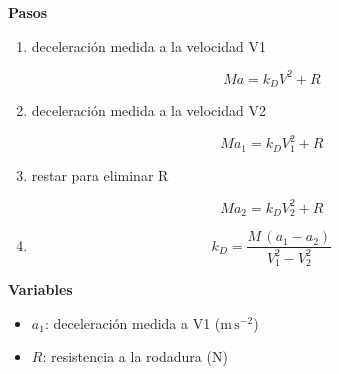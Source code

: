 \documentclass[10pt,openany]{book}
\begin{document}
\begin{tcolorbox}[title={Desarrollos del modelo}, studiumdef, breakable]
\noindent\textbf{Pasos}
\begin{enumerate}
\item
deceleración medida a la velocidad V1

\[
M a = k_D V^{2} + R
\]
\item
deceleración medida a la velocidad V2

\[
M a_1 = k_D V_1^{2} + R
\]
\item
restar para eliminar R

\[
M a_2 = k_D V_2^{2} + R
\]
\item

\[
k_D = \frac{M\,(a_1 - a_2)}{V_1^{2} - V_2^{2}}
\]
\end{enumerate}

\noindent\textbf{Variables}
\begin{itemize}
\item $a_{1}$: deceleración medida a V1 ($\mathrm{m}\,\mathrm{s}^{-2}$)
\item $R$: resistencia a la rodadura ($\mathrm{N}$)
\end{itemize}


\end{tcolorbox}
\end{document}
